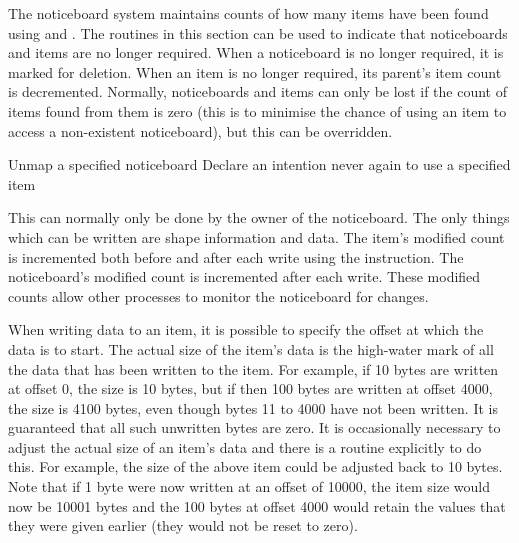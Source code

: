       The noticeboard system maintains counts of how many items have been
      found using {} and {}%
. The routines in this
      section can be used to indicate that noticeboards and items are no
      longer required. When a noticeboard is no longer required, it is marked
      for deletion. When an item is no longer required, its parent's item
      count is decremented. Normally, noticeboards and items can only be lost
      if the count of items found from them is zero (this is to minimise the
      chance of using an item {} to access a non-existent %
noticeboard), but
      this can be overridden.

\begin{mansectionroutines}
      Unmap a specified noticeboard
      Declare an intention never again to use a specified item
\end{mansectionroutines}

      This can normally only be done by the owner of the noticeboard. The only
      things which can be written are shape information and data. The item's
      modified count is incremented both before and after each write using the
      {} instruction. The noticeboard's modified %
count is
      incremented after each write. These modified counts allow other processes
      to monitor the noticeboard for changes.

      When writing data to an item, it is possible to specify the offset
      at which the data is to start. The actual size of the item's data
      is the high-water mark of all the data that has been written to the
      item. For example, if 10 bytes are written at offset 0, the size is
      10 bytes, but if then 100 bytes are written at offset 4000, the size
      is 4100 bytes, even though bytes 11 to 4000 have not been written.
      It is guaranteed that all such unwritten bytes are zero. It is
      occasionally necessary to adjust the actual size of an item's data
      and there is a routine explicitly to do this. For example, the size
      of the above item could be adjusted back to 10 bytes. Note that if
      1 byte were now written at an offset of 10000, the item size would
      now be 10001 bytes and the 100 bytes at offset 4000 would retain the
      values that they were given earlier (they would not be reset to zero).

